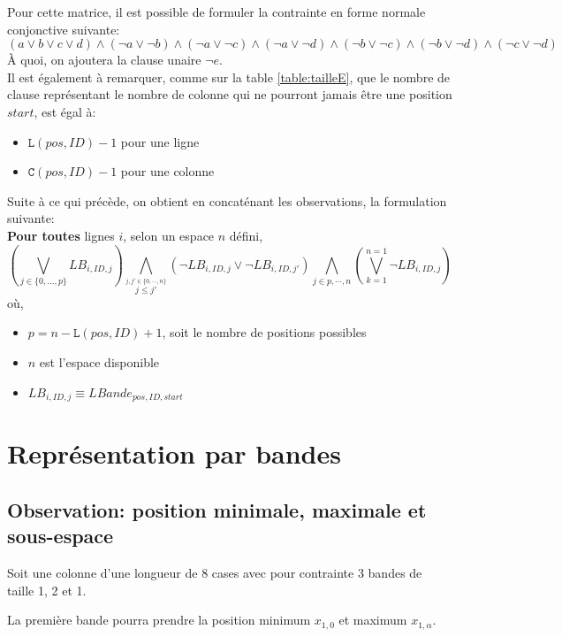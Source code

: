 \documentclass[a4paper,12pt]{report}
\begin{document}
Pour cette matrice, il est possible de formuler la contrainte en forme normale conjonctive suivante:
$$ (a \vee b \vee c \vee d ) \wedge (\lnot a \vee \lnot b) \wedge (\lnot a \vee \lnot c) \wedge (\lnot a \vee \lnot d)\wedge (\lnot b \vee \lnot c) \wedge (\lnot b \vee \lnot d)\wedge (\lnot c \vee \lnot d)$$   
À quoi, on ajoutera la clause unaire $\lnot e$.\\

Il est également à remarquer, comme sur la table \ref{table:tailleE}, que le nombre de clause représentant le nombre de colonne qui ne pourront jamais être une position $start$, est égal à:
\begin{itemize}
\item[]$\mathtt{L}(pos,ID) - 1$ pour une ligne 
\item[]$\mathtt{C}(pos,ID)-1$ pour une colonne\\
\end{itemize}

Suite à ce qui précède, on obtient en concaténant les observations, la formulation suivante:\\
\textbf{Pour toutes} lignes $i$, selon un espace $n$ défini,
$$
\left( \bigvee_{ j \in \{	0,...,p\} } LB_{i,ID,j} \right)
\bigwedge_{\stackrel{j,j' \in \{0,\cdots,n\}}{j\leq j'}} (\lnot LB_{i,ID,j} \vee \lnot LB_{i,ID,j'})
\bigwedge_{j \in {p,\cdots,n}}\left(\bigvee_{k=1}^{n=1}\lnot LB_{i,ID,j}\right)
$$  
où,
\begin{itemize}
\item[]$p = n-\mathtt{L}(pos,ID)+1$, soit le nombre de positions possibles
\item[]$n$ est l'espace disponible
\item[]$LB_{i,ID,j} \equiv LBande_{pos,ID,start}$
\end{itemize}	

\section{Représentation par bandes}
\subsection{Observation: position minimale, maximale et sous-espace}

Soit une colonne d'une longueur de 8 cases avec pour contrainte 3 bandes de taille 1, 2 et 1.

La première bande pourra prendre la position minimum $x_{1,0}$ et maximum $x_{1,\alpha}$.
\end{document}
